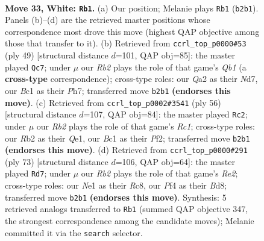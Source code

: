 \documentclass[11pt]{article}
\begin{document}
\clearpage

\begin{figure}[p]\centering
\begin{subfigure}{0.46\textwidth}\centering
\resizebox{\linewidth}{!}{%
\newchessgame
\chessboard[
  setfen={1rb3k1/p1nqbrn1/7p/P1p2p2/3p1Pp1/1P4P1/QRR1P1BP/2BNN1K1 w - - 4 33},
  showmover=false,
  pgfstyle=straightmove, color=movearrow, markmove={b2-b1}
]}
\caption{}
\end{subfigure}\hfill
\begin{subfigure}{0.46\textwidth}\centering
\resizebox{\linewidth}{!}{%
\newchessgame
\chessboard[
  setfen={bqrr2k1/3nbppp/pp1pp3/8/1PP1PP2/P1NQB2P/6P1/1BR2R1K b - - 18 25},
  showmover=false,
  pgfstyle=straightmove, color=movearrow, markmove={b8-c7}
]}
\caption{}
\end{subfigure}
\\[4pt]
\begin{subfigure}{0.46\textwidth}\centering
\resizebox{\linewidth}{!}{%
\newchessgame
\chessboard[
  setfen={br1r4/1q2bppk/pp1pp1np/8/1PP1P3/P1N1B2P/5PP1/2RRQBK1 w - - 3 29},
  showmover=false,
  pgfstyle=straightmove, color=movearrow, markmove={c1-c2}
]}
\caption{}
\end{subfigure}\hfill
\begin{subfigure}{0.46\textwidth}\centering
\resizebox{\linewidth}{!}{%
\newchessgame
\chessboard[
  setfen={2rb1nk1/q3rpp1/1pb1p2p/2p1P3/P1P2P1P/1RN3P1/3BQ2K/R4B2 b - - 2 37},
  showmover=false,
  pgfstyle=straightmove, color=movearrow, markmove={e7-d7}
]}
\caption{}
\end{subfigure}
\caption{\textbf{Move 33, White: \texttt{Rb1}.} (a) Our position; Melanie plays \texttt{Rb1} (\texttt{b2b1}). Panels (b)--(d) are the retrieved master positions whose correspondence most drove this move (highest QAP objective among those that transfer to it). (b) Retrieved from \texttt{ccrl\_top\_p0000\#53} (ply 49) [structural distance $d$=101, QAP obj=85]: the master played \texttt{Qc7}; under $\mu$ our \emph{Rb2} plays the role of that game's \emph{Qb1} (a \textbf{cross-type} correspondence); cross-type roles: our \emph{Q}a2 as their \emph{N}d7, our \emph{B}c1 as their \emph{P}h7; transferred move \texttt{b2b1} \textbf{(endorses this move)}. (c) Retrieved from \texttt{ccrl\_top\_p0002\#3541} (ply 56) [structural distance $d$=107, QAP obj=84]: the master played \texttt{Rc2}; under $\mu$ our \emph{Rb2} plays the role of that game's \emph{Rc1}; cross-type roles: our \emph{R}b2 as their \emph{Q}e1, our \emph{B}c1 as their \emph{P}f2; transferred move \texttt{b2b1} \textbf{(endorses this move)}. (d) Retrieved from \texttt{ccrl\_top\_p0000\#291} (ply 73) [structural distance $d$=106, QAP obj=64]: the master played \texttt{Rd7}; under $\mu$ our \emph{Rb2} plays the role of that game's \emph{Re2}; cross-type roles: our \emph{N}e1 as their \emph{R}c8, our \emph{P}f4 as their \emph{B}d8; transferred move \texttt{b2b1} \textbf{(endorses this move)}. Synthesis: 5 retrieved analogs transferred to \texttt{Rb1} (summed QAP objective 347, the strongest correspondence among the candidate moves); Melanie committed it via the \texttt{search} selector.}
\label{fig:thought-m64}
\end{figure}
\end{document}
